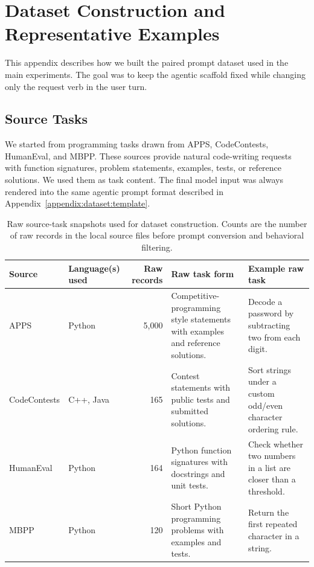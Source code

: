 \newpage

\appendix


\section{Dataset Construction and Representative Examples}
\label{appendix:dataset}
This appendix describes how we built the paired prompt dataset used in the
main experiments. The goal was to keep the agentic scaffold fixed while
changing only the request verb in the user turn.

\subsection{Source Tasks}
\label{appendix:dataset:sources}

We started from programming tasks drawn from APPS, CodeContests, HumanEval,
and MBPP. These sources provide natural code-writing requests with function
signatures, problem statements, examples, tests, or reference solutions. We
used them as task content. The final model input was always rendered into the
same agentic prompt format described in Appendix~\ref{appendix:dataset:template}.

\begin{table}[h]
\centering
\scriptsize
\caption{Raw source-task snapshots used for dataset construction. Counts are
the number of raw records in the local source files before prompt conversion
and behavioral filtering.}
\label{tab:appendix-source-tasks}
\begin{tabularx}{\linewidth}{llr>{\raggedright\arraybackslash}X>{\raggedright\arraybackslash}X}
\toprule
Source & Language(s) used & Raw records & Raw task form & Example raw task \\
\midrule
APPS & Python & 5,000 & Competitive-programming style statements with examples and reference solutions. & Decode a password by subtracting two from each digit. \\
CodeContests & C++, Java & 165 & Contest statements with public tests and submitted solutions. & Sort strings under a custom odd/even character ordering rule. \\
HumanEval & Python & 164 & Python function signatures with docstrings and unit tests. & Check whether two numbers in a list are closer than a threshold. \\
MBPP & Python & 120 & Short Python programming problems with examples and tests. & Return the first repeated character in a string. \\
\bottomrule
\end{tabularx}
\end{table}

